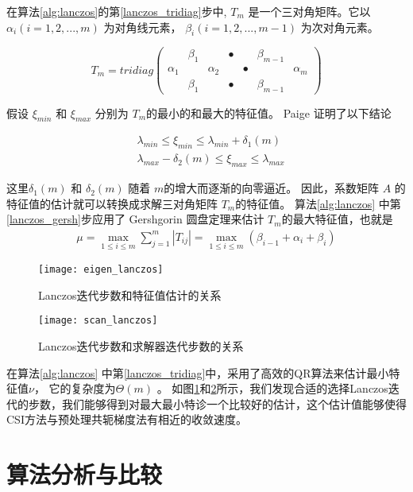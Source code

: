 在算法\ref{alg:lanczos}的第\ref{lanczos_tridiag}步中, $T_m$ 是一个三对角矩阵。它以 $\alpha_i (i=1,2,...,m)$ 为对角线元素，  $\beta_i (i=1,2,...,m-1)$ 为次对角元素。 

\[ T_{m} = tridiag\left(\begin{array}{ccccccc}
&\beta_1 && \bullet & &\beta_{m-1}&    \\
\alpha_1 & &\alpha_2 && \bullet &&\alpha_{m}\\
&\beta_1 && \bullet & & \beta_{m-1}&
\end{array} \right)\]

假设 $\xi_{min}$ 和 $\xi_{max}$ 分别为 $T_m$的最小的和最大的特征值。 Paige\cite{Paige1980235} 证明了以下结论

\begin{align}
&\lambda_{min} \le \xi_{min} \le \lambda_{min}+\delta_1(m) \\
&\lambda_{max}-\delta_2(m)  \le \xi_{max} \le \lambda_{max}
\end{align}

这里$\delta_1(m)$ 和 $\delta_2(m)$ 随着 $m$的增大而逐渐的向零逼近。 因此，系数矩阵 $A$ 的特征值的估计就可以转换成求解三对角矩阵  $T_m$的特征值。 
算法\ref{alg:lanczos} 中第\ref{lanczos_gersh}步应用了 Gershgorin 圆盘定理来估计 $T_m$的最大特征值，也就是 
\begin{align}
\mu = \max_{1 \le i \le m}\sum^m_{j=1}|T_{ij}|=\max_{1 \le i \le m}(\beta_{i-1}+\alpha_i +\beta_{i})
\end{align}
 
\begin {figure}%
\centering
\texttt{[image: eigen\_lanczos]}
\caption[] { Lanczos迭代步数和特征值估计的关系\label{fig:lanczos_eigs}}
\end{figure}
\begin {figure}%
\centering
\texttt{[image: scan\_lanczos]}
\caption[] { Lanczos迭代步数和求解器迭代步数的关系\label{fig:lanczos_iter}}
\end{figure}
在算法\ref{alg:lanczos} 中第\ref{lanczos_tridiag}中，采用了高效的QR算法\cite{ortega1963llt}来估计最小特征值$\nu$， 它的复杂度为$\Theta(m)$ 。 
如图\ref{fig:lanczos_eigs}和\ref{fig:lanczos_iter}所示，我们发现合适的选择Lanczos迭代的步数，我们能够得到对最大最小特诊一个比较好的估计，这个估计值能够使得CSI方法与预处理共轭梯度法有相近的收敛速度。  


\section{算法分析与比较}
\label{solver:Algorithm}
 
